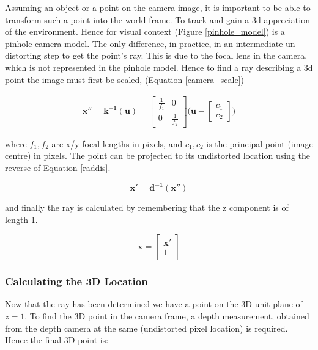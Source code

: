 \documentclass[11pt,twoside]{report}
\begin{document}
Assuming an object or a point on the camera image, it is important to be able to transform such a point into the world frame. To track and gain a 3d appreciation of the environment. Hence for visual context (Figure \ref{pinhole_model}) is a pinhole camera model. The only difference, in practice, in an intermediate un-distorting step to get the point's ray. This is due to the focal lens in the camera, which is not represented in the pinhole model. Hence to find a ray describing a 3d point the image must first be scaled, (Equation \ref{camera_scale})


\begin{equation}
\begin{aligned}
\mathbf{x''} = \mathbf{k^{-1}(u)} = 
\begin{bmatrix}
\frac{1}{f_{1}} & 0 \\[0.3em]
0 & \frac{1}{f_{2}}
\end{bmatrix}
\bigg (
\mathbf{u} -
\begin{bmatrix}
c_{1} \\[0.3em]
c_{2}
\end{bmatrix}
\bigg )
\end{aligned}
\label{camera_scale}
\end{equation}

where $f_{1},f_{2}$ are x/y focal lengths in pixels, and $c_{1},c_{2}$ is the principal point (image centre) in pixels. The point can be projected to its undistorted location using the reverse of Equation \ref{raddis}.

\begin{equation}
\mathbf{x'} = \mathbf{d^{-1}(x'')}
\label{camera_scale2}
\end{equation}

and finally the ray is calculated by remembering that the z component is of length 1.

\begin{equation}
\mathbf{x} = 
\begin{bmatrix}
\mathbf{x'} \\
1
\end{bmatrix}
\label{to_3d_ray}
\end{equation}

\subsubsection{Calculating the 3D Location}

Now that the ray has been determined we have a point on the 3D unit plane of $z=1$. To find the 3D point in the camera frame, a depth measurement, obtained from the depth camera at the same (undistorted pixel location) is required. Hence the final 3D point is:
\end{document}
